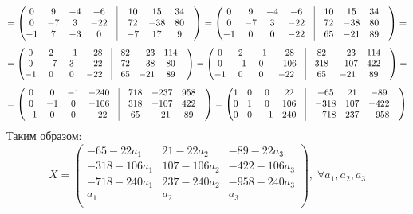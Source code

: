 \documentclass[a4paper,12pt]{article}
\begin{document}
\[
= \begin{pmatrix}
0 & 9 & -4 & -6 & \vrule &10 & 15 & 34 & \\
0 & -7 & 3 & -22 & \vrule &72 & -38 & 80 & \\
-1 & 7 & -3 & 0 & \vrule &-7 & 17 & 9 & \\
\end{pmatrix} = \begin{pmatrix}
0 & 9 & -4 & -6 & \vrule &10 & 15 & 34 & \\
0 & -7 & 3 & -22 & \vrule &72 & -38 & 80 & \\
-1 & 0 & 0 & -22 & \vrule &65 & -21 & 89 & \\
\end{pmatrix} = 
\]
\[
= \begin{pmatrix}
0 & 2 & -1 & -28 & \vrule &82 & -23 & 114 & \\
0 & -7 & 3 & -22 & \vrule &72 & -38 & 80 & \\
-1 & 0 & 0 & -22 & \vrule &65 & -21 & 89 & \\
\end{pmatrix} = \begin{pmatrix}
0 & 2 & -1 & -28 & \vrule &82 & -23 & 114 & \\
0 & -1 & 0 & -106 & \vrule &318 & -107 & 422 & \\
-1 & 0 & 0 & -22 & \vrule &65 & -21 & 89 & \\
\end{pmatrix} =
\]
\[
= \begin{pmatrix}
0 & 0 & -1 & -240 & \vrule &718 & -237 & 958 & \\
0 & -1 & 0 & -106 & \vrule &318 & -107 & 422 & \\
-1 & 0 & 0 & -22 & \vrule &65 & -21 & 89 & \\
\end{pmatrix} = 
 \begin{pmatrix}
1 & 0 & 0 & 22 & \vrule &-65 & 21 & -89 & \\
0 & 1 & 0 & 106 & \vrule &-318 & 107 & -422 & \\
0 & 0 & -1 & 240 & \vrule &-718 & 237 & -958 & \\
\end{pmatrix}
\]
Таким образом:
\[
X = 
\begin{pmatrix}
-65 - 22a_1 & 21 - 22a_2 & -89 - 22a_3 \\
-318 - 106a_1 & 107 - 106a_2 & -422 - 106a_3 \\
-718 - 240a_1 & 237 - 240a_2 & -958 - 240a_3\\
a_1 & a_2 & a_3 \\
\end{pmatrix}, \; \forall a_1, a_2, a_3
\]
\end{document}

